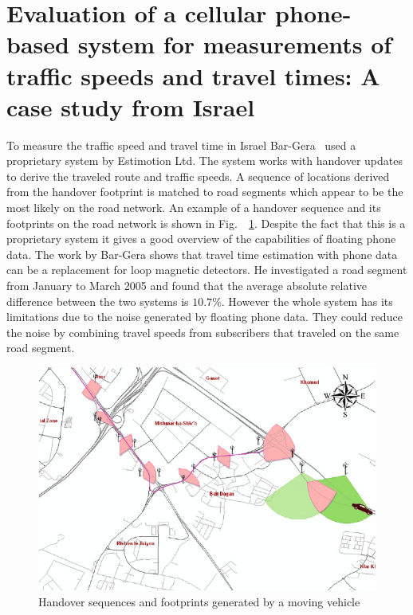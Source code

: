 \section{Evaluation of a cellular phone-based system for measurements of traffic speeds and travel times: A case study from Israel}
To measure the traffic speed and travel time in Israel Bar-Gera~\cite{Bar2007} used a proprietary system by Estimotion Ltd. The system works with handover updates to derive the traveled route and traffic speeds. A sequence of locations derived from the handover footprint is matched to road segments which appear to be the most likely on the road network. An example of a handover sequence and its footprints on the road network is shown in Fig.\ ~\ref{fig:bar}. Despite the fact that this is a proprietary system it gives a good overview of the capabilities of floating phone data. The work by Bar-Gera shows that travel time estimation with phone data can be a replacement for loop magnetic detectors. He investigated a road segment from January to March 2005 and found that the average absolute relative difference between the two systems is $10.7\%$. However the whole system has its limitations due to the noise generated by floating phone data. They could reduce the noise by combining travel speeds from subscribers that traveled on the same road segment.
\begin{figure}
\centering
\includegraphics[width=\linewidth]{images/bar.pdf}
\caption{Handover sequences and footprints generated by a moving vehicle~\cite{Bar2007}}
\label{fig:bar}
\end{figure}

